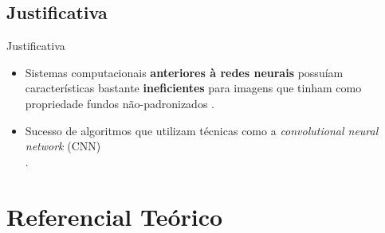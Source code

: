 \documentclass[aspectratio=169, xcolor=dvipsnames]{beamer}
\let\olditem=\item%
\renewcommand{\item}{\olditem \justifying}
\begin{document}
	\subsection{Justificativa}
	\begin{frame}{Justificativa}
		\begin{itemize}
			\setlength\itemsep{2em}
			\item Sistemas computacionais \textbf{anteriores à redes neurais} possuíam características bastante \textbf{ineficientes} para imagens que tinham como propriedade fundos não-padronizados \cite{Garcia2004}.

			\item Sucesso de algoritmos que utilizam técnicas como a \textit{convolutional neural network} (CNN) \cite{LeCun1989} \\ \cite{LeCun1990H} \cite{LeCun1998G} \cite{Haoxiang2015}.
		\end{itemize}
	\end{frame}

\section{Referencial Teórico}
\end{document}
